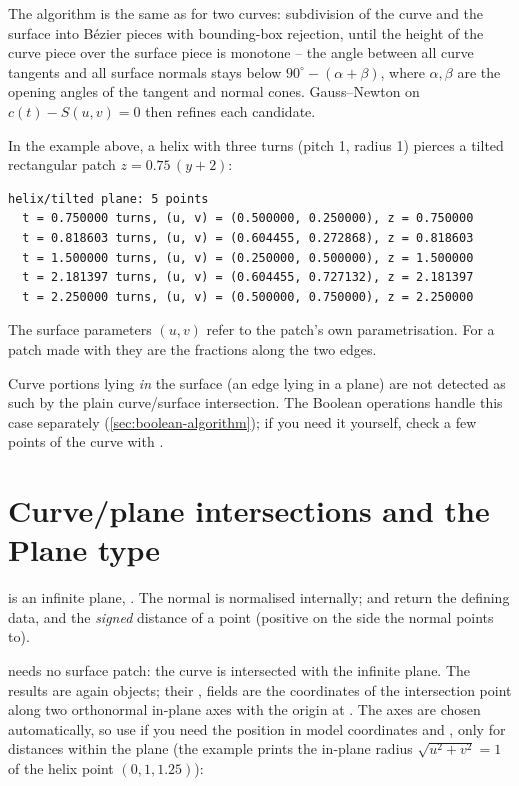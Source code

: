 The algorithm is the same as for two curves: subdivision of the curve and the surface into
Bézier pieces with bounding-box rejection, until the height of the curve piece over the
surface piece is monotone -- the angle between all curve tangents and all surface normals
stays below $90^\circ - (\alpha+\beta)$, where $\alpha,\beta$ are the opening angles of the
tangent and normal cones. Gauss--Newton on $c(t) - S(u,v) = 0$ then refines each candidate.

In the example above, a helix with three turns (pitch 1, radius 1) pierces a tilted
rectangular patch $z = 0.75\,(y+2)$:

\begin{lstlisting}[style=text]
helix/tilted plane: 5 points
  t = 0.750000 turns, (u, v) = (0.500000, 0.250000), z = 0.750000
  t = 0.818603 turns, (u, v) = (0.604455, 0.272868), z = 0.818603
  t = 1.500000 turns, (u, v) = (0.250000, 0.500000), z = 1.500000
  t = 2.181397 turns, (u, v) = (0.604455, 0.727132), z = 2.181397
  t = 2.250000 turns, (u, v) = (0.500000, 0.750000), z = 2.250000
\end{lstlisting}

The surface parameters $(u,v)$ refer to the patch's own parametrisation. For a patch made
with  they are the fractions along the two
edges.

\begin{note}
Curve portions lying \emph{in} the surface (an edge lying in a plane) are not detected as
such by the plain curve/surface intersection. The Boolean operations handle this case
separately (\cref{sec:boolean-algorithm}); if you need it yourself, check a few points of the
curve with .
\end{note}

\section{Curve/plane intersections and the Plane type}\label{sec:isect-plane}

 is an infinite plane, . The normal is
normalised internally;  and  return the defining data,
and  the \emph{signed} distance of a point (positive on the side the
normal points to).

 needs no surface patch: the curve is intersected with the
infinite plane. The results are again  objects; their
,  fields are the coordinates of the intersection point along two orthonormal
in-plane axes with the origin at . The axes are chosen automatically, so use
 if you need the position in model coordinates and ,  only for
distances within the plane (the example prints the in-plane radius
$\sqrt{u^2+v^2} = 1$ of the helix point $(0, 1, 1.25)$):

